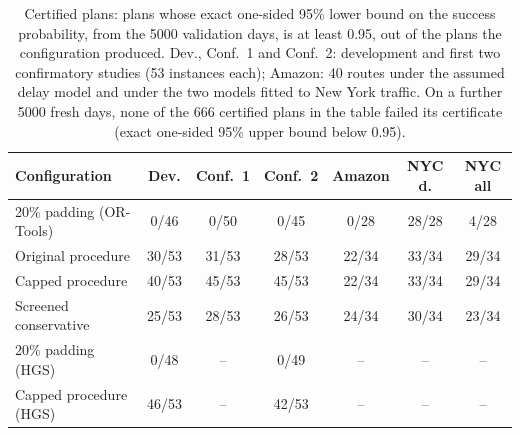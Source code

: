 \begin{table}[t]
\centering
\small
\setlength{\tabcolsep}{4pt}
\caption{Certified plans: plans whose exact one-sided 95\% lower bound on the success probability, from the 5000 validation days, is at least 0.95, out of the plans the configuration produced. Dev., Conf.~1 and Conf.~2: development and first two confirmatory studies (53 instances each); Amazon: 40 routes under the assumed delay model and under the two models fitted to New York traffic. On a further 5000 fresh days, none of the 666 certified plans in the table failed its certificate (exact one-sided 95\% upper bound below 0.95).}
\label{tab:certify}
\begin{tabular}{@{}lcccccc@{}}
\toprule
Configuration & Dev. & Conf.\ 1 & Conf.\ 2 & Amazon & NYC d. & NYC all\\
\midrule
20\% padding (OR-Tools) & 0/46 & 0/50 & 0/45 & 0/28 & 28/28 & 4/28\\
Original procedure & 30/53 & 31/53 & 28/53 & 22/34 & 33/34 & 29/34\\
Capped procedure & 40/53 & 45/53 & 45/53 & 22/34 & 33/34 & 29/34\\
Screened conservative & 25/53 & 28/53 & 26/53 & 24/34 & 30/34 & 23/34\\
20\% padding (HGS) & 0/48 & -- & 0/49 & -- & -- & --\\
Capped procedure (HGS) & 46/53 & -- & 42/53 & -- & -- & --\\
\bottomrule
\end{tabular}
\end{table}
